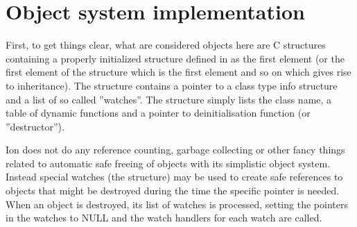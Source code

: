 \section{Object system implementation}

First, to get things clear, what are considered objects here are C
structures containing a properly initialized \type{}
structure defined in  as the first element (or the
first element of the structure which is the first element and so on which
gives rise to inheritance). The  structure contains a pointer
to a  class type info structure and
a list of so called ''watches''. The  structure simply
lists the class name, a table of dynamic functions and a pointer to
deinitialisation function (or ''destructor'').

Ion does not do any reference counting, garbage collecting or other
fancy things related to automatic safe freeing of objects with its
simplistic object system. Instead special watches (the 
 structure) may be used to create safe references to
objects that might be destroyed during the time the specific pointer is
needed. When an object is destroyed, its list of watches is processed,
setting the pointers in the watches to NULL and the watch handlers for
each watch are called. 
